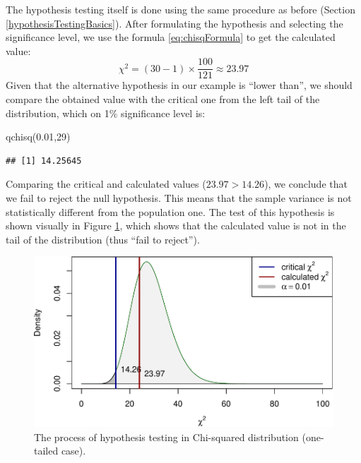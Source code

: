 \documentclass[
]{book}
\newenvironment{Shaded}{\begin{snugshade}}{\end{snugshade}}
\newcommand{\DecValTok}[1]{\textcolor[rgb]{0.00,0.00,0.81}{#1}}
\newcommand{\FloatTok}[1]{\textcolor[rgb]{0.00,0.00,0.81}{#1}}
\newcommand{\FunctionTok}[1]{\textcolor[rgb]{0.00,0.00,0.00}{#1}}
\newcommand{\NormalTok}[1]{#1}
\theoremstyle{definition}
\theoremstyle{definition}
\theoremstyle{definition}
\theoremstyle{definition}
\theoremstyle{remark}
\begin{document}
The hypothesis testing itself is done using the same procedure as before (Section \ref{hypothesisTestingBasics}). After formulating the hypothesis and selecting the significance level, we use the formula \eqref{eq:chisqFormula} to get the calculated value:
\begin{equation*}
    \chi^2 = (30-1) \times \frac{100}{121} \approx 23.97
\end{equation*}
Given that the alternative hypothesis in our example is ``lower than'', we should compare the obtained value with the critical one from the left tail of the distribution, which on 1\% significance level is:

\begin{Shaded}
\begin{Highlighting}[]
\FunctionTok{qchisq}\NormalTok{(}\FloatTok{0.01}\NormalTok{,}\DecValTok{29}\NormalTok{)}
\end{Highlighting}
\end{Shaded}

\begin{verbatim}
## [1] 14.25645
\end{verbatim}

Comparing the critical and calculated values (\(23.97>14.26\)), we conclude that we fail to reject the null hypothesis. This means that the sample variance is not statistically different from the population one. The test of this hypothesis is shown visually in Figure \ref{fig:hypothesisTestingChiSquared}, which shows that the calculated value is not in the tail of the distribution (thus ``fail to reject'').

\begin{figure}
\centering
\includegraphics{Svetunkov---Statistics-for-Business-Analytics_files/figure-latex/hypothesisTestingChiSquared-1.pdf}
\caption{\label{fig:hypothesisTestingChiSquared}The process of hypothesis testing in Chi-squared distribution (one-tailed case).}
\end{figure}
\end{document}
